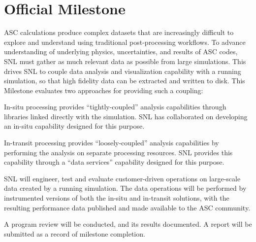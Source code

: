 \section{Official Milestone}
\label{sec:OfficialMilestone}


ASC calculations produce complex datasets that are increasingly difficult to explore and understand using traditional post-processing workflows.  To advance understanding of underlying physics, uncertainties, and results of ASC codes, SNL must gather as much relevant data as possible from large simulations.  This drives SNL to couple data analysis and visualization capability with a running simulation, so that high fidelity data can be extracted and written to disk.  This Milestone evaluates two approaches for providing such a coupling:

\begin{enumerate}
\begin{item}
In-situ processing provides ``tightly-coupled'' analysis capabilities through libraries linked directly with the simulation.  SNL has collaborated on developing an in-situ capability designed for this purpose.
\end{item}
\begin{item}
In-transit processing provides ``loosely-coupled'' analysis capabilities by performing the analysis on separate processing resources.  SNL provides this capability through a ``data services'' capability designed for this purpose.
\end{item}
\end{enumerate}

SNL will engineer, test and evaluate customer-driven operations on large-scale data created by a running simulation.  The data operations will be performed by instrumented versions of both the in-situ and in-transit solutions, with the resulting performance data published and made available to the ASC community.

A program review will be conducted, and its results documented.  A report will be submitted as a record of milestone completion.

